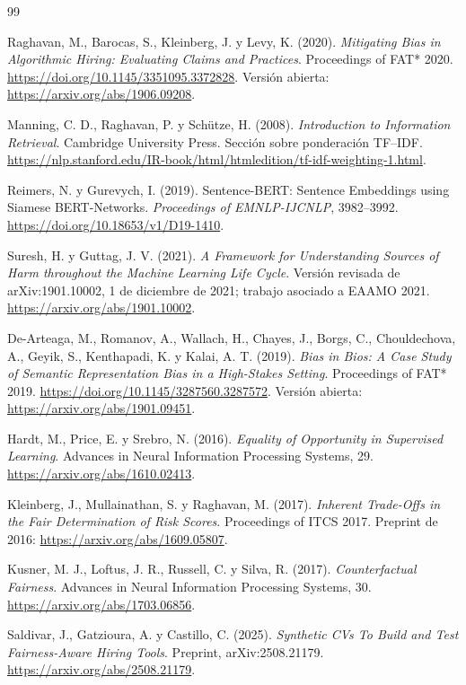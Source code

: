 \documentclass[11pt,a4paper,oneside]{report}
\begin{document}
\begin{thebibliography}{99}
\small
\setlength{\itemsep}{0.45em}

 Raghavan, M., Barocas, S., Kleinberg, J. y Levy, K. (2020). \textit{Mitigating Bias in Algorithmic Hiring: Evaluating Claims and Practices}. Proceedings of FAT* 2020. \url{https://doi.org/10.1145/3351095.3372828}. Versión abierta: \url{https://arxiv.org/abs/1906.09208}.

 Manning, C. D., Raghavan, P. y Schütze, H. (2008). \textit{Introduction to Information Retrieval}. Cambridge University Press. Sección sobre ponderación TF--IDF. \url{https://nlp.stanford.edu/IR-book/html/htmledition/tf-idf-weighting-1.html}.

 Reimers, N. y Gurevych, I. (2019). Sentence-BERT: Sentence Embeddings using Siamese BERT-Networks. \textit{Proceedings of EMNLP-IJCNLP}, 3982--3992. \url{https://doi.org/10.18653/v1/D19-1410}.

 Suresh, H. y Guttag, J. V. (2021). \textit{A Framework for Understanding Sources of Harm throughout the Machine Learning Life Cycle}. Versión revisada de arXiv:1901.10002, 1 de diciembre de 2021; trabajo asociado a EAAMO 2021. \url{https://arxiv.org/abs/1901.10002}.

 De-Arteaga, M., Romanov, A., Wallach, H., Chayes, J., Borgs, C., Chouldechova, A., Geyik, S., Kenthapadi, K. y Kalai, A. T. (2019). \textit{Bias in Bios: A Case Study of Semantic Representation Bias in a High-Stakes Setting}. Proceedings of FAT* 2019. \url{https://doi.org/10.1145/3287560.3287572}. Versión abierta: \url{https://arxiv.org/abs/1901.09451}.

 Hardt, M., Price, E. y Srebro, N. (2016). \textit{Equality of Opportunity in Supervised Learning}. Advances in Neural Information Processing Systems, 29. \url{https://arxiv.org/abs/1610.02413}.

 Kleinberg, J., Mullainathan, S. y Raghavan, M. (2017). \textit{Inherent Trade-Offs in the Fair Determination of Risk Scores}. Proceedings of ITCS 2017. Preprint de 2016: \url{https://arxiv.org/abs/1609.05807}.

 Kusner, M. J., Loftus, J. R., Russell, C. y Silva, R. (2017). \textit{Counterfactual Fairness}. Advances in Neural Information Processing Systems, 30. \url{https://arxiv.org/abs/1703.06856}.

 Saldivar, J., Gatzioura, A. y Castillo, C. (2025). \textit{Synthetic CVs To Build and Test Fairness-Aware Hiring Tools}. Preprint, arXiv:2508.21179. \url{https://arxiv.org/abs/2508.21179}.


\end{thebibliography}
\end{document}
